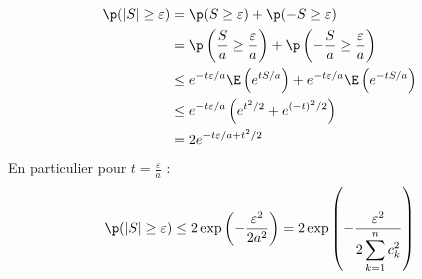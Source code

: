 \documentclass[8pt]{book}
\begin{document}
\begin{enumerate}
		\begin{align*}
			\p(|S|\geq \varepsilon)&=\p(S\geq \varepsilon)+\p(-S\geq \varepsilon)\\
			&=\p\left(\frac{S}{a}\geq \frac{\varepsilon}{a}\right)+\p\left(-\frac{S}{a}\geq \frac{\varepsilon}{a}\right)\\
			&\leq e^{-t\varepsilon/a}\E\left(e^{tS/a}\right)+e^{-t\varepsilon/a}\E\left(e^{-tS/a}\right)\\
			&\leq e^{-t\varepsilon/a}\left(e^{t^2/2}+e^{(-t)^2/2}\right)\\
			&=2e^{-t\varepsilon/a+t^2/2}
		\end{align*}
		En particulier pour $t=\displaystyle\frac{\varepsilon}{a}$ :
		$$\p(|S|\geq \varepsilon)\leq 2\operatorname{exp}\left(-\frac{\varepsilon^2}{2a^2}\right)=2\operatorname{exp}\left(-\frac{\varepsilon^2}{2\displaystyle\sum\limits_{k=1}^nc_k^2}\right)$$
	\end{enumerate}
	
\end{document}
